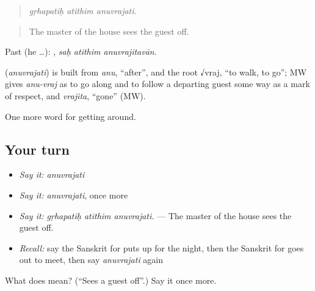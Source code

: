 \begin{quote}
\emph{gṛhapatiḥ atithim anuvrajati.}
\end{quote}

\begin{quote}
The master of the house sees the guest off.
\end{quote}

Past (he …):   , \emph{saḥ atithim anuvrajitavān}.

\begin{cousinweb}
\textbf{} (\emph{anuvrajati}) is built from \emph{anu}, \textquotedblleft{}after\textquotedblright{}, and the root √vraj, \textquotedblleft{}to walk, to go\textquotedblright{}; MW gives \emph{anu-vraj} as to go along and to follow a departing guest some way as a mark of respect, and \emph{vrajita}, \textquotedblleft{}gone\textquotedblright{} (MW).
\end{cousinweb}

\begin{grammarlens}[title={What you've built}]
One more word for getting around.
\end{grammarlens}

\subsection*{Your turn}
\begin{itemize}
\raggedright
  \item \emph{Say it:} \emph{anuvrajati}
  \item \emph{Say it:} \emph{anuvrajati}, once more
  \item \emph{Say it:} \emph{gṛhapatiḥ atithim anuvrajati.} — The master of the house sees the guest off.
  \item \emph{Recall:} say the Sanskrit for puts up for the night, then the Sanskrit for goes out to meet, then say \emph{anuvrajati} again
\end{itemize}

\begin{tcolorbox}[breakable,colback=teal!4,colframe=teal!35!black,title={Before you move on}]
What does  mean? (\textquotedblleft{}Sees a guest off\textquotedblright{}.) Say it once more.
\end{tcolorbox}
